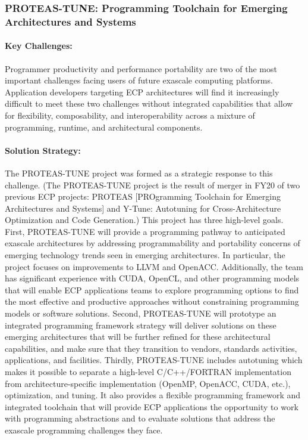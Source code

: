 \subsubsection{ PROTEAS-TUNE: Programming Toolchain for Emerging Architectures and Systems} 

\paragraph{Key  Challenges:}
Programmer productivity and performance portability are two of the most important challenges facing users of future exascale computing platforms. Application developers targeting ECP architectures will find it increasingly difficult to meet these two challenges without integrated capabilities that allow for flexibility, composability, and interoperability across a mixture of programming, runtime, and architectural components. 


\paragraph{Solution Strategy:}
The PROTEAS-TUNE project was formed as a strategic response to this challenge. (The PROTEAS-TUNE project is the result of merger in FY20 of two previous ECP projects: PROTEAS [PROgramming Toolchain for Emerging Architectures and Systems] and Y-Tune: Autotuning for Cross-Architecture Optimization and Code Generation.) 
This project has three high-level goals. First, PROTEAS-TUNE will provide a programming pathway to anticipated exascale architectures by addressing programmability and portability concerns of emerging technology trends seen in emerging architectures. In particular, the project focuses on improvements to LLVM and OpenACC. Additionally, the team has significant experience with CUDA, OpenCL, and other programming models that will enable ECP applications teams to explore programming options to find the most effective and productive approaches without constraining programming models or software solutions. Second, PROTEAS-TUNE will prototype an integrated programming framework strategy will deliver solutions on these emerging architectures that will be further refined for these architectural capabilities, and make sure that they transition to vendors, standards activities, applications, and facilities. Thirdly, PROTEAS-TUNE includes autotuning which makes it possible to separate a high-level C/C++/FORTRAN implementation from architecture-specific implementation (OpenMP, OpenACC, CUDA, etc.), optimization, and tuning. It also provides a flexible programming framework and integrated toolchain that will provide ECP applications the opportunity to work with programming abstractions and to evaluate solutions that address the exascale programming challenges they face. 


